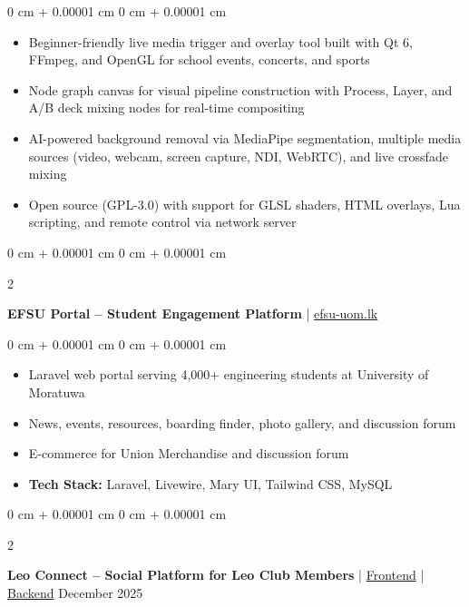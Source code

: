 \documentclass[10pt, letterpaper]{article}
\newenvironment{highlights}{
    \begin{itemize}[
        topsep=0.10 cm,
        parsep=0.10 cm,
        partopsep=0pt,
        itemsep=0pt,
        leftmargin=0 cm + 10pt
    ]
}{
    \end{itemize}
} %
\newenvironment{onecolentry}{
    \begin{adjustwidth}{
        0 cm + 0.00001 cm
    }{
        0 cm + 0.00001 cm
    }
}{
    \end{adjustwidth}
} %
\newenvironment{twocolentry}[2][]{
    \onecolentry
    \def\secondColumn{#2}
    \setcolumnwidth{\fill, 4.5 cm}
    \begin{paracol}{2}
}{
    \switchcolumn \raggedleft \secondColumn
    \end{paracol}
    \endonecolentry
} %
\let\hrefWithoutArrow\href
\begin{document}
        \vspace{0.10 cm}
        \begin{onecolentry}
            \begin{highlights}
                \item Beginner-friendly live media trigger and overlay tool built with Qt 6, FFmpeg, and OpenGL for school events, concerts, and sports
                \item Node graph canvas for visual pipeline construction with Process, Layer, and A/B deck mixing nodes for real-time compositing
                \item AI-powered background removal via MediaPipe segmentation, multiple media sources (video, webcam, screen capture, NDI, WebRTC), and live crossfade mixing
                \item Open source (GPL-3.0) with support for GLSL shaders, HTML overlays, Lua scripting, and remote control via network server
            \end{highlights}
        \end{onecolentry}

        \vspace{0.30 cm}
        \begin{twocolentry}{
            2025
        }
            \textbf{EFSU Portal – Student Engagement Platform} | \hrefWithoutArrow{https://efsu-uom.lk}{efsu-uom.lk}\end{twocolentry}

        \vspace{0.10 cm}
        \begin{onecolentry}
            \begin{highlights}
                \item Laravel web portal serving 4,000+ engineering students at University of Moratuwa
                \item News, events, resources, boarding finder, photo gallery, and discussion forum
                \item E-commerce for Union Merchandise and discussion forum
                \item \textbf{Tech Stack:} Laravel, Livewire, Mary UI, Tailwind CSS, MySQL
            \end{highlights}
        \end{onecolentry}

        \vspace{0.30 cm}
        \begin{twocolentry}{
            December 2025
        }
            \textbf{Leo Connect – Social Platform for Leo Club Members} | \hrefWithoutArrow{https://github.com/Rexosphere/Leoconnect}{Frontend} | \hrefWithoutArrow{https://github.com/Rexosphere/LeoConnect_Backend}{Backend}\end{twocolentry}
\end{document}
